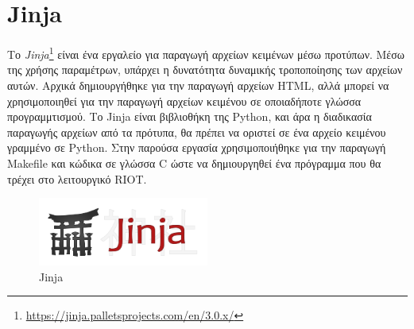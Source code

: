 \section{Jinja}
\label{sec:jinja}

Το \textit{Jinja}\footnote{\url{https://jinja.palletsprojects.com/en/3.0.x/}} είναι ένα εργαλείο για παραγωγή αρχείων κειμένων μέσω προτύπων. Μέσω της χρήσης παραμέτρων, υπάρχει η δυνατότητα δυναμικής τροποποίησης των αρχείων αυτών. Αρχικά δημιουργήθηκε για την παραγωγή αρχείων HTML, αλλά μπορεί να χρησιμοποιηθεί για την παραγωγή αρχείων κειμένου σε οποιαδήποτε γλώσσα προγραμμτισμού. Το Jinja είναι βιβλιοθήκη της Python, και άρα η διαδικασία παραγωγής αρχείων από τα πρότυπα, θα πρέπει να οριστεί σε ένα αρχείο κειμένου γραμμένο σε Python. Στην παρούσα εργασία χρησιμοποιήθηκε για την παραγωγή Makefile και κώδικα σε γλώσσα C ώστε να δημιουργηθεί ένα πρόγραμμα που θα τρέχει στο λειτουργικό RIOT.

\begin{figure}[!ht]
  \centering
  \includegraphics[width=0.5\textwidth]{./images/chapter4/jinja.png}
  \caption{Jinja}
  \label{fig:jinja}
\end{figure}